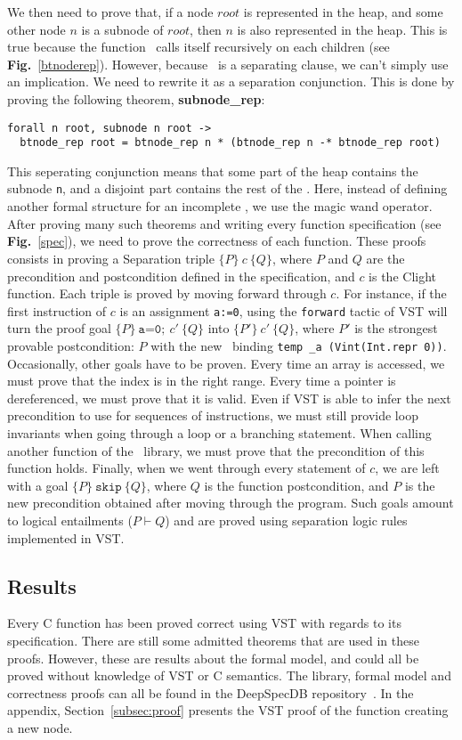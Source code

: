 We then need to prove that, if a node $root$ is represented in the heap, and some other node $n$ is a subnode of $root$, then $n$ is also represented in the heap.
This is true because the function \btrep\ calls itself recursively on each children (see \textbf{Fig.}~\ref{btnoderep}).
However, because \btrep\ is a separating clause, we can't simply use an implication. We need to rewrite it as a separation conjunction.
This is done by proving the following theorem, \textbf{subnode\_rep}:

\begin{lstlisting}[language=Coq]
  forall n root, subnode n root ->
  btnode_rep root = btnode_rep n * (btnode_rep n -* btnode_rep root)
\end{lstlisting}

This seperating conjunction means that some part of the heap contains the subnode \texttt{n}, and a disjoint part contains the rest of the \btree.
Here, instead of defining another formal structure for an incomplete \btree, we use the magic wand operator.
After proving many such theorems and writing every function specification (see \textbf{Fig.}~\ref{spec}), we need to prove the correctness of each function.
These proofs consists in proving a Separation triple $\{P\}~c~\{Q\}$, where $P$ and $Q$ are the precondition and postcondition defined in the specification, and $c$ is the Clight function.
Each triple is proved by moving forward through $c$.
For instance, if the first instruction of $c$ is an assignment \texttt{a:=0}, using the \lstinline[language=Coq]{forward} tactic of VST will turn the proof goal $\{P\}~\texttt{a=0};~c'~\{Q\}$ into $\{P'\}~c'~\{Q\}$,
where $P'$ is the strongest provable postcondition: $P$ with the new \local\ binding \texttt{temp \_a (Vint(Int.repr 0))}.
Occasionally, other goals have to be proven.
Every time an array is accessed, we must prove that the index is in the right range.
Every time a pointer is dereferenced, we must prove that it is valid.
Even if VST is able to infer the next precondition to use for sequences of instructions, we must still provide loop invariants when going through a loop or a branching statement.
When calling another function of the \btrees\ library, we must prove that the precondition of this function holds.
Finally, when we went through every statement of $c$, we are left with a goal $\{P\}~\texttt{skip}~\{Q\}$, where $Q$ is the function postcondition, and $P$ is the new precondition obtained after moving through the program.
Such goals amount to logical entailments ($P\vdash Q$) and are proved using separation logic rules implemented in VST.

\subsection{Results}
Every C function has been proved correct using VST with regards to its specification.
There are still some admitted theorems that are used in these proofs.
However, these are results about the formal model, and could all be proved without knowledge of VST or C semantics. The library, formal model and correctness proofs can all be found in the DeepSpecDB repository~\cite{deepdb}.
In the appendix, Section~\ref{subsec:proof} presents the VST proof of the function creating a new node.
